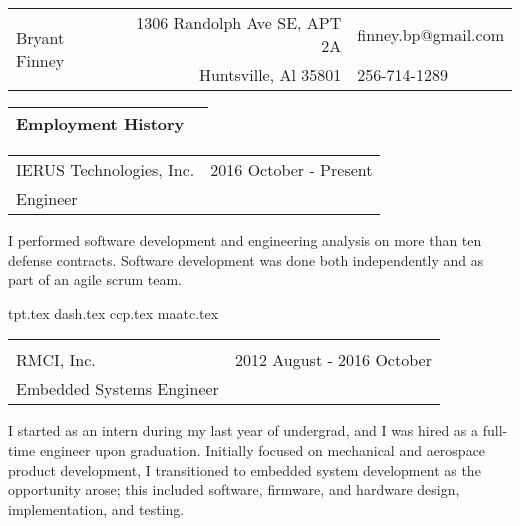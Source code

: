 \documentclass[10pt,a4paper]{article}
\begin{document}
\begin{table}
  \noindent\begin{tabularx}{\textwidth}{Xr|l}
    \toprule
    \multirow{2}{*}{\Huge Bryant Finney} & 1306 Randolph Ave SE, APT 2A & finney.bp@gmail.com \\
                                         & Huntsville, Al 35801         & 256-714-1289        \\
    \bottomrule
  \end{tabularx}
\end{table}

\noindent\begin{tabularx}{\textwidth}{Xr}
  \Large Employment History & \\
  \bottomrule
\end{tabularx}
\smallskip

\noindent\begin{tabularx}{\textwidth}{Xr}
  IERUS Technologies, Inc. & 2016 October - Present \\
  Engineer                 &                        \\
\end{tabularx}
\smallskip

I performed software development and engineering analysis on more than ten defense
contracts. Software development was done both independently and as part of an agile
scrum team.

\bigskip

{tpt.tex}
{dash.tex}
{ccp.tex}
{maatc.tex}

\noindent\begin{tabularx}{\textwidth}{Xr}
  \Large                                                 \\ \bottomrule \\
  RMCI, Inc.                & 2012 August - 2016 October \\
  Embedded Systems Engineer &                            \\
\end{tabularx}
\smallskip

I started as an intern during my last year of undergrad, and I was hired as a full-time
engineer upon graduation. Initially focused on mechanical and aerospace product
development, I transitioned to embedded system development as the opportunity arose; this
included software, firmware, and hardware design, implementation, and testing.
\end{document}
